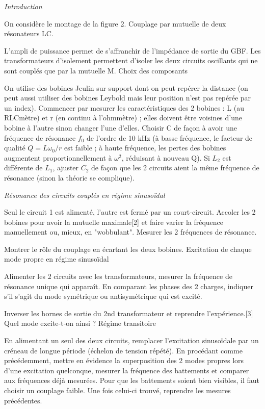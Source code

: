 \documentclass{article}%
\begin{document}
\textit{Introduction}

On considère le montage de la figure 2.
Couplage par mutuelle de deux résonateurs LC.



L'ampli de puissance permet de s'affranchir de l'impédance de sortie du GBF. Les transformateurs d'isolement permettent d'isoler les deux circuits oscillants qui ne sont couplés que par la mutuelle M.
Choix des composants

    On utilise des bobines Jeulin sur support dont on peut repérer la distance (on peut aussi utiliser des bobines Leybold mais leur position n'est pas repérée par un index).
    Commencer par mesurer les caractéristiques des 2 bobines : L (au RLCmètre) et r (en continu à l'ohmmètre) ; elles doivent être voisines d'une bobine à l'autre sinon changer l'une d'elles.
    Choisir C de façon à avoir une fréquence de résonance $f_0$ de l'ordre de 10 kHz (à basse fréquence, le facteur de qualité $Q = L\omega_0/r$ est faible ; à haute fréquence, les pertes des bobines augmentent proportionnellement à $\omega^{2}$, réduisant à nouveau Q).
    Si $L_2$ est différente de $L_1$, ajuster $C_2$ de façon que les 2 circuits aient la même fréquence de résonance (sinon la théorie se complique).

    \textit{Résonance des circuits couplés en régime sinusoïdal}

Seul le circuit 1 est alimenté, l'autre est fermé par un court-circuit. Accoler les 2 bobines pour avoir la mutuelle maximale[2] et faire varier la fréquence manuellement ou, mieux, en "wobbulant". Mesurer les 2 fréquences de résonance.

Montrer le rôle du couplage en écartant les deux bobines.
Excitation de chaque mode propre en régime sinusoïdal

Alimenter les 2 circuits avec les transformateurs, mesurer la fréquence de résonance unique qui apparaît. En comparant les phases des 2 charges, indiquer s'il s'agit du mode symétrique ou antisymétrique qui est excité.

Inverser les bornes de sortie du 2nd transformateur et reprendre l'expérience.[3] Quel mode excite-t-on ainsi ?
Régime transitoire

En alimentant un seul des deux circuits, remplacer l'excitation sinusoïdale par un créneau de longue période (échelon de tension répété). En procédant comme précédemment, mettre en évidence la superposition des 2 modes propres lors d'une excitation quelconque, mesurer la fréquence des battements et comparer aux fréquences déjà mesurées. Pour que les battements soient bien visibles, il faut choisir un couplage faible. Une fois celui-ci trouvé, reprendre les mesures précédentes.
\end{document}
